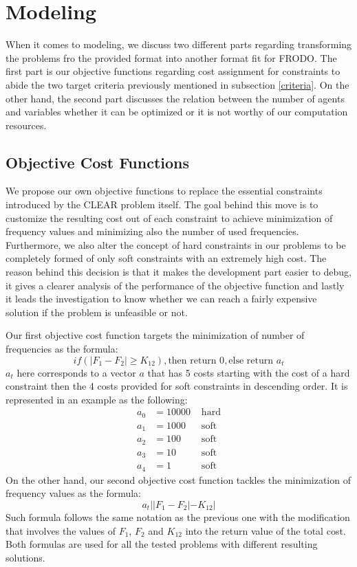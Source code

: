 \documentclass{article}
\begin{document}
	\section{Modeling}
	When it comes to modeling, we discuss two different parts regarding transforming the problems fro the provided format into another format fit for FRODO. The first part is our objective functions regarding cost assignment for constraints to abide the two target criteria previously mentioned in subsection \ref{criteria}. On the other hand, the second part discusses the relation between the number of agents and variables whether it can be optimized or it is not worthy of our computation resources.
	\subsection{Objective Cost Functions}
	We propose our own objective functions to replace the essential constraints introduced by the CLEAR problem itself. The goal behind this move is to customize the resulting cost out of each constraint to achieve minimization of frequency values and minimizing also the number of used frequencies. Furthermore, we also alter the concept of hard constraints in our problems to be completely formed of only soft constraints with an extremely high cost. The reason behind this decision is that it makes the development part easier to debug, it gives a clearer analysis of the performance of the objective function and lastly it leads the investigation to know whether we can reach a fairly expensive solution if the problem is unfeasible or not.
	
	Our first objective cost function targets the minimization of number of frequencies as the formula:
	\[if(|F_1 - F_2| \geq K_{12}), \text{then return 0}, \text{else return } a_t\]
	$a_t$ here corresponds to a vector $a$ that has 5 costs starting with the cost of a hard constraint then the 4 costs provided for soft constraints in descending order. It is represented in an example as the following:
	\begin{align}
		a_0 &= 10000 &\text{ hard}\\
		a_1 &= 1000 &\text{ soft}\\
		a_2 &= 100 &\text{ soft}\\
		a_3 &= 10 &\text{ soft}\\
		a_4 &= 1 &\text{ soft}
	\end{align}
	On the other hand, our second objective cost function tackles the minimization of frequency values as the formula:
	\[a_t||F_1 - F_2| - K_{12}|\]
	Such formula follows the same notation as the previous one with the modification that involves the values of $F_1$, $F_2$ and $K_{12}$ into the return value of the total cost. Both formulas are used for all the tested problems with different resulting solutions.
\end{document}
